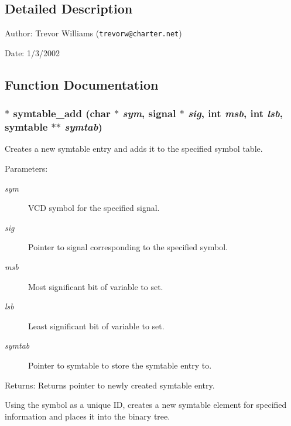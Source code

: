 \subsection{Detailed Description}
\begin{Desc}
\item[Author:]Trevor Williams ({\tt trevorw@charter.net}) \end{Desc}
\begin{Desc}
\item[Date:]1/3/2002\end{Desc}


\subsection{Function Documentation}
\subsubsection{$\ast$ symtable\_\-add (char $\ast$ {\em sym}, {\bf signal} $\ast$ {\em sig}, int {\em msb}, int {\em lsb}, {\bf symtable} $\ast$$\ast$ {\em symtab})}\label{symtable_8c_a0}


Creates a new symtable entry and adds it to the specified symbol table.

\begin{Desc}
\item[Parameters:]
\begin{description}
\item[{\em sym}]VCD symbol for the specified signal. \item[{\em sig}]Pointer to signal corresponding to the specified symbol. \item[{\em msb}]Most significant bit of variable to set. \item[{\em lsb}]Least significant bit of variable to set. \item[{\em symtab}]Pointer to symtable to store the symtable entry to.\end{description}
\end{Desc}
\begin{Desc}
\item[Returns:]Returns pointer to newly created symtable entry.\end{Desc}
Using the symbol as a unique ID, creates a new symtable element for specified information and places it into the binary tree. 
